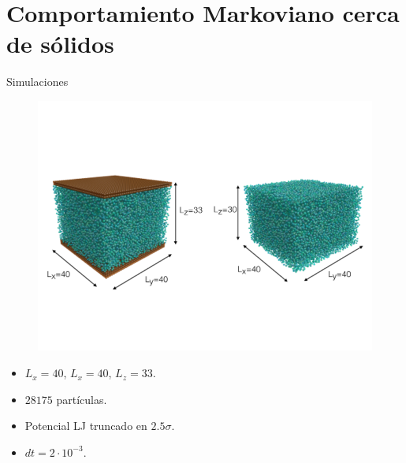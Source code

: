 \documentclass{beamer}
\begin{document}
\section{Comportamiento Markoviano cerca de sólidos}

\begin{frame}{Simulaciones}
\begin{figure}
    \centering
    \includegraphics[width=0.8\linewidth]{dim-sim-pbc-walls}
\end{figure}
    \begin{itemize}
      \item $L_x=40$, $L_x=40$, $L_z=33$.
     \item $28175$ partículas. 
     \item Potencial LJ truncado en $2.5\sigma$.
     \item $dt=2\cdot 10^{-3}$.
    \end{itemize}
\end{frame}
\end{document}
